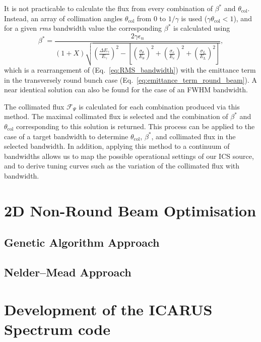 \documentclass[../main.tex]{subfiles}
\begin{document}
It is not practicable to calculate the flux from every combination of $\beta^{*}$ and $\theta_{\mathrm{col}}$. Instead, an array of collimation angles $\theta_{\mathrm{col}}$ from 0 to $1/\gamma$ is used ($\gamma\theta_{\mathrm{col}}<1$), and for a given \textit{rms} bandwidth value the corresponding $\beta^*$ is calculated using
\begin{equation}
\beta^{*} = \frac{2\gamma\epsilon_{n}}{\left(1+X\right)\sqrt{\left(\frac{\Delta E_{\gamma}}{E_{\gamma}}\right)^{2}-\left[\left(\frac{\sigma_{\theta}}{E_{\theta}}\right)^{2}+\left(\frac{\sigma_{e}}{E_{e}}\right)^{2}+\left(\frac{\sigma_{L}}{E_{L}}\right)^{2}\right]}},
\label{eq:beta_star_round_beam}
\end{equation}
which is a rearrangement of (Eq.~\ref{eq:RMS_bandwidth}) with the emittance term in the transversely round bunch case (Eq.~\ref{eq:emittance_term_round_beam}). A near identical solution can also be found for the case of an FWHM bandwidth. 

The collimated flux $\mathcal{F}_{\Psi}$ is calculated for each combination produced via this method. The maximal collimated flux is selected and the combination of $\beta^{*}$ and $\theta_{\mathrm{col}}$ corresponding to this solution is returned. This process can be applied to the case of a target bandwidth to determine $\theta_{\mathrm{col}}$, $\beta^{*}$, and collimated flux in the selected bandwidth. In addition, applying this method to a continuum of bandwidths allows us to map the possible operational settings of our ICS source, and to derive tuning curves such as the variation of the collimated flux with bandwidth.

\section{2D Non-Round Beam Optimisation}

\subsection{Genetic Algorithm Approach}

\subsection{Nelder--Mead Approach}

\section{Development of the ICARUS Spectrum code}
\label{sec:development_of_the_ICARUS_spectrum_code}
\end{document}
